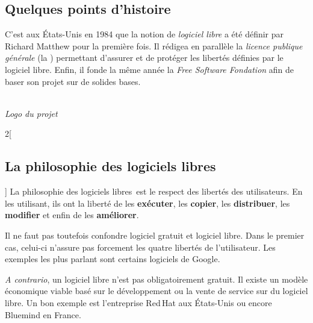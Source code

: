 \newcommand{\lls}{logiciels libres~}


\subsection{Quelques points d’histoire}
\begin{minipage}{0.7\textwidth}
C’est aux États-Unis en 1984 que la notion de \textcolor{Cdl}{\textit{logiciel libre}} a été définir par \textcolor{Cdl}{Richard Matthew } pour la première fois. Il rédigea en parallèle la \textcolor{Cdl}{\textit{licence publique générale }} (la ) permettant d’assurer et de protéger les libertés définies par le logiciel libre. Enfin, il fonde la même année la \textcolor{Cdl}{\textit{Free Software Fondation}} afin de baser son projet sur de solides bases.
\end{minipage}
\begin{minipage}{0.3\textwidth}
\begin{center}
\\
\textit{Logo du projet }
\end{center}
\end{minipage}

\begin{multicols}{2}[\subsection{La philosophie des logiciels libres}]
La philosophie des \lls est le respect des libertés des utilisateurs. En les utilisant, ils ont la liberté de les \textbf{exécuter}, les \textbf{copier}, les \textbf{distribuer}, les \textbf{modifier} et enfin de les \textbf{améliorer}.

Il ne faut pas toutefois confondre logiciel gratuit et logiciel libre. Dans le premier cas, celui-ci n’assure pas forcement les quatre libertés de l’utilisateur. Les exemples les plus parlant sont certains logiciels de Google.

\textit{A contrario}, un  logiciel libre n’est pas obligatoirement gratuit. Il existe un modèle économique viable basé sur le développement ou la vente de service sur du logiciel libre. Un bon exemple est l’entreprise Red\,Hat aux États-Unis ou encore Bluemind en France.
\end{multicols}

